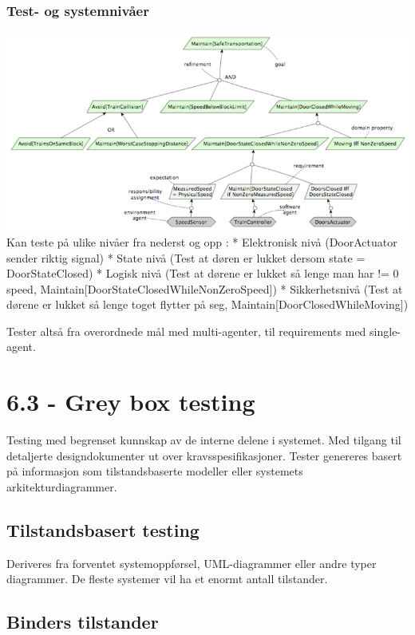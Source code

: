 \subsubsection{Test- og systemnivåer}

\includegraphics{Forelesning 06/img/2.png} Kan teste på ulike nivåer fra
nederst og opp : * Elektronisk nivå (DoorActuator sender riktig signal)
* State nivå (Test at døren er lukket dersom state = DoorStateClosed) *
Logisk nivå (Test at dørene er lukket så lenge man har != 0 speed,
Maintain{[}DoorStateClosedWhileNonZeroSpeed{]}) * Sikkerhetsnivå (Test
at dørene er lukket så lenge toget flytter på seg,
Maintain{[}DoorClosedWhileMoving{]})

Tester altså fra overordnede mål med multi-agenter, til requirements med
single-agent.

\section{6.3 - Grey box testing}

Testing med begrenset kunnskap av de interne delene i systemet. Med
tilgang til detaljerte designdokumenter ut over kravsspesifikasjoner.
Tester genereres basert på informasjon som tilstandsbaserte modeller
eller systemets arkitekturdiagrammer.

\subsection{Tilstandsbasert testing}

Deriveres fra forventet systemoppførsel, UML-diagrammer eller andre
typer diagrammer. De fleste systemer vil ha et enormt antall tilstander.

\subsection{Binders tilstander}

